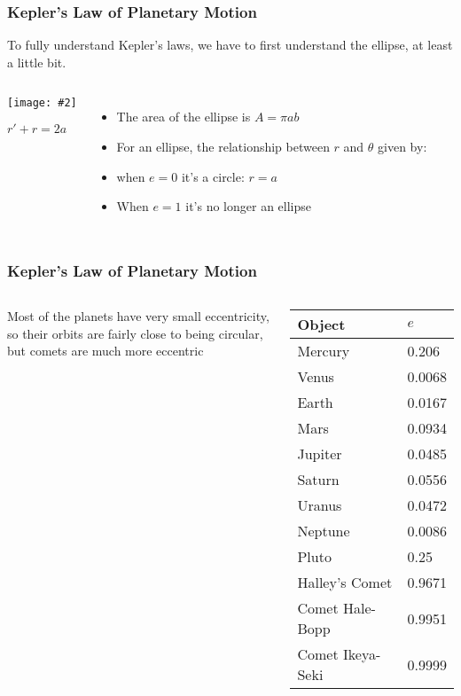\documentclass[12pt,compress,aspectratio=169]{beamer}
\newcommand{\pic}[2]{\texttt{[image: \#2]}}
\newcommand{\eq}[2]{\vspace{#1}{\Large\begin{displaymath}#2\end{displaymath}}}
\begin{document}
\begin{frame}
  \frametitle{Kepler's Law of Planetary Motion}
  To fully understand Kepler's laws, we have to first understand the ellipse,
  at least a little bit.

  \begin{columns}
    \begin{center}
      \pic{1.25}{elliporb.png}
      
      $r' + r =2a$
    \end{center}

    \begin{itemize}
    \item The area of the ellipse is $A=\pi ab$
    \item For an ellipse, the relationship between $r$ and $\theta$ given by:

      \eq{-.35in}{
        r=\frac{a(1-e^2)}{1+e\cos\theta}
        \quad\textnormal{\normalsize where}\quad
        0\leq e < 1
      }
    \item when $e=0$ it's a circle: $r=a$
    \item When $e=1$ it's no longer an ellipse
    \end{itemize}
  \end{columns}
\end{frame}


\begin{frame}
  \frametitle{Kepler's Law of Planetary Motion}
  \begin{columns}
    Most of the planets have very small eccentricity, so their orbits are
    fairly close to being circular, but comets are much more eccentric

    \begin{tabular}{l|l}
      \rowcolor{pink}
      \textbf{Object} & $e$ \\ \hline
      Mercury	& \num{.206} \\
      Venus	& \num{.0068} \\
      Earth	& \num{.0167} \\
      Mars	& \num{.0934} \\
      Jupiter	& \num{.0485} \\
      Saturn	& \num{.0556} \\
      Uranus	& \num{.0472} \\
      Neptune	& \num{.0086} \\
      Pluto	& \num{.25} \\ \hline
      Halley's Comet   & \num{.9671} \\
      Comet Hale-Bopp  & \num{.9951} \\
      Comet Ikeya-Seki & \num{.9999}
    \end{tabular}
  \end{columns}
\end{frame}
\end{document}
